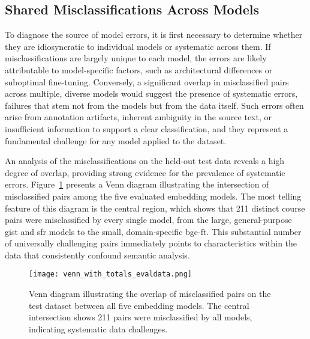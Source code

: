 \subsection{Shared Misclassifications Across Models}
To diagnose the source of model errors, it is first necessary to determine whether they are idiosyncratic to individual models or systematic across them. If misclassifications are largely unique to each model, the errors are likely attributable to model-specific factors, such as architectural differences or suboptimal fine-tuning. Conversely, a significant overlap in misclassified pairs across multiple, diverse models would suggest the presence of systematic errors, failures that stem not from the models but from the data itself. Such errors often arise from annotation artifacts, inherent ambiguity in the source text, or insufficient information to support a clear classification, and they represent a fundamental challenge for any model applied to the dataset.

An analysis of the misclassifications on the held-out test data reveals a high degree of overlap, providing strong evidence for the prevalence of systematic errors. Figure~\ref{fig:venn_misclassified} presents a Venn diagram illustrating the intersection of misclassified pairs among the five evaluated embedding models. The most telling feature of this diagram is the central region, which shows that 211 distinct course pairs were misclassified by every single model, from the large, general-purpose gist and sfr models to the small, domain-specific bge-ft. This substantial number of universally challenging pairs immediately points to characteristics within the data that consistently confound semantic analysis.
\begin{figure}[tb]
\centering
\texttt{[image: venn\_with\_totals\_evaldata.png]}
\caption{Venn diagram illustrating the overlap of misclassified pairs on the test dataset between all five embedding models. The central intersection shows 211 pairs were misclassified by all models, indicating systematic data challenges.}
\label{fig:venn_misclassified}
\end{figure}

